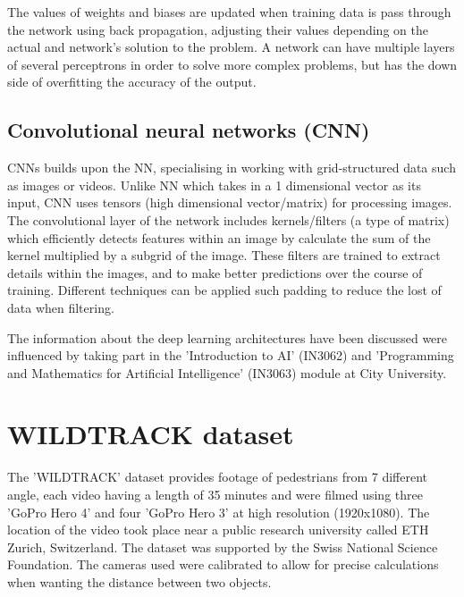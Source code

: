 \documentclass[12pt]{report}
\begin{document}
\vspace{5 mm}

The values of weights and biases are updated when training data is pass through the network using back propagation, adjusting their values depending on the actual and network's solution to the problem. A network can have multiple layers of several perceptrons in order to solve more complex problems, but has the down side of overfitting the accuracy of the output.


\subsection{Convolutional neural networks (CNN)}

CNNs builds upon the NN, specialising in working with grid-structured data such as images or videos. Unlike NN which takes in a 1 dimensional vector as its input, CNN uses tensors (high dimensional vector/matrix) for processing images. The convolutional layer of the network includes kernels/filters (a type of matrix) which efficiently detects features within an image by calculate the sum of the kernel multiplied by a subgrid of the image. These filters are trained to extract details within the images, and to make better predictions over the course of training. Different techniques can be applied such padding to reduce the lost of data when filtering.

\vspace{2mm}

The information about the deep learning architectures have been discussed were influenced by taking part in the 'Introduction to AI' (IN3062) and 'Programming and Mathematics for Artificial Intelligence' (IN3063) module at City University.

\section{WILDTRACK dataset}

The 'WILDTRACK' dataset provides footage of pedestrians from 7 different angle, each video having a length of 35 minutes and were filmed using three 'GoPro Hero 4' and four 'GoPro Hero 3' at high resolution (1920x1080). The location of the video took place near a public research university called ETH Zurich, Switzerland. The dataset was supported by the Swiss National Science Foundation. The cameras used were calibrated to allow for precise calculations when wanting the distance between two objects.
\end{document}
